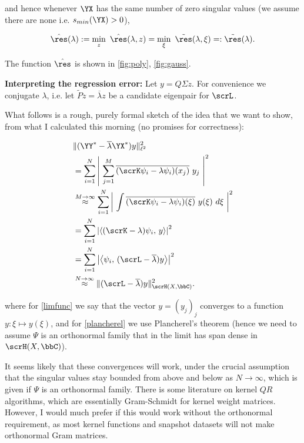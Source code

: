 and hence whenever $\YX$ has the same number of zero singular values (we assume there 
are none i.e. $s_{min} (\YX) > 0$),

\begin{equation}
    \hat{\res} (\lambda) := \min_z\ \hat{\res} (\lambda, z) 
    = \min_\xi\ \tilde{\res} (\lambda, \xi) =: \tilde{\res} (\lambda) . 
\end{equation}

The function $\hat{\res}$ is shown in \ref{fig:poly}, \ref{fig:gauss}. 

\textbf{Interpreting the regression error:} Let $y = Q \Sigma z$. For convenience we 
conjugate $\lambda$, i.e. let $\tilde{P} z = \overline{\lambda} z$ be a candidate 
eigenpair for $\scrL$. 

What follows is a rough, purely formal sketch of the idea that we want to show, 
from what I calculated this morning (no promises for correctness):

\begin{align}
    &\| (\YY^* - \overline{\lambda} \YX^*) y \|_{\ell^2}^2 \\
    &= \sum_{i=1}^N \left|\ 
        \sum_{j=1}^{M} \overline{(\scrK \psi_i - \lambda \psi_i) (x_j)}\ y_j
     \ \right|^2 \\
    &\stackrel{M \to \infty}{\approx} 
     \sum_{i=1}^{N} \left|\ 
        \int \overline{(\scrK \psi_i - \lambda \psi_i) (\xi)}\ y (\xi)\ d\xi
     \ \right|^2 \label{limfunc} \\
    &= \sum_{i=1}^{N} \left| \left\langle (\scrK - \lambda) \psi_i,\, y \right\rangle \right|^2 \\
    &= \sum_{i=1}^{N} \left| \left\langle \psi_i,\, (\scrL - \overline{\lambda}) y \right\rangle \right|^2 \\
    &\stackrel{N \to \infty}{\approx}
     \| (\scrL - \overline{\lambda}) y \|_{\scrH (X, \bbC)}^2 . \label{plancherel}
\end{align}

where for \ref{limfunc} we say that the vector $y = (y_j)_j$ converges to a function 
$y : \xi \mapsto y (\xi)$, and for \ref{plancherel} we use Plancherel's theorem (hence 
we need to assume $\Psi$ is an orthonormal family that in the limit has span dense in 
$\scrH(X, \bbC)$). 

It seems likely that these convergences will work, under the crucial assumption that 
the singular values stay bounded from above and below as $N \to \infty$, which  is given 
if $\Psi$ is an orthonormal family. There is some literature on kernel $QR$ algorithms, 
which are essentially Gram-Schmidt for kernel weight matrices. However, I would much 
prefer if this would work without the orthonormal requirement, as most kernel functions 
and snapshot datasets will not make orthonormal Gram matrices. 

